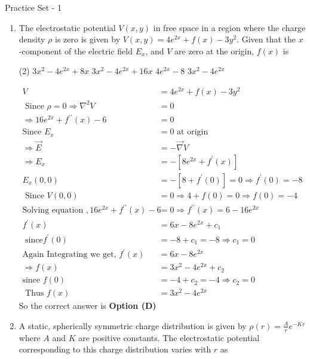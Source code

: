 \begin{abox}
Practice Set - 1
\end{abox}
\begin{enumerate}
	\item  The electrostatic potential $V(x, y)$ in free space in a region where the charge density $\rho$ is zero is given by $V(x, y)=4 e^{2 x}+f(x)-3 y^{2}$. Given that the $x$-component of the electric field $E_{x}$, and $V$ are zero at the origin, $f(x)$ is
	{}
	\begin{tasks}(2)
		\task[\textbf{A.}] $3 x^{2}-4 e^{2 x}+8 x$
		\task[\textbf{B.}] $3 x^{2}-4 e^{2 x}+16 x$
		\task[\textbf{C.}] $4 e^{2 x}-8$
		\task[\textbf{D.}] $3 x^{2}-4 e^{2 x}$
	\end{tasks}
	\begin{answer}
		\begin{align*}
		V&=4 e^{2 x}+f(x)-3 y^{2} \\\text{ Since }\rho=0 \Rightarrow \nabla^{2} V&=0\\ \Rightarrow 16 e^{2 x}+f^{\prime \prime}(x)-6&=0\\
		\text{Since }E_{x}&=0\text{ at origin }\\\Rightarrow \vec{E}&=-\vec{\nabla} V\\ \Rightarrow E_{x}&=-\left[8 e^{2 x}+f^{\prime}(x)\right]\\
		E_{x}(0,0)&=-\left[8+f^{\prime}(0)\right]=0 \Rightarrow f^{\prime}(0)=-8\\
		\text{	Since }V(0,0)&=0 \Rightarrow 4+f(0)=0 \Rightarrow f(0)=-4\\
		\text{Solving  equation }, 16 e^{2 x}+f^{\prime \prime}(x)-6&=0 \Rightarrow f^{\prime \prime}(x)=6-16 e^{2 x} \\ f^{\prime}(x)&=6 x-8 e^{2 x}+c_{1}\\\text{ since}
		f^{\prime}(0)&=-8+c_{1}=-8 \Rightarrow c_{1}=0\\
		\text{Again Integrating we get, }f^{\prime}(x)&=6 x-8 e^{2 x}\\ \Rightarrow f(x)&=3 x^{2}-4 e^{2 x}+c_{2}\\
		\text{since }f(0)&=-4+c_{2}=-4 \Rightarrow c_{2}=0\\\text{ Thus }f(x)&=3 x^{2}-4 e^{2 x}
		\end{align*}
		So the correct answer is \textbf{Option (D)}
	\end{answer}
	\item A static, spherically symmetric charge distribution is given by $\rho(r)=\frac{A}{r} e^{-K r}$ where $A$ and $K$ are positive constants. The electrostatic potential corresponding to this charge distribution varies with $r$ as

\end{enumerate}
